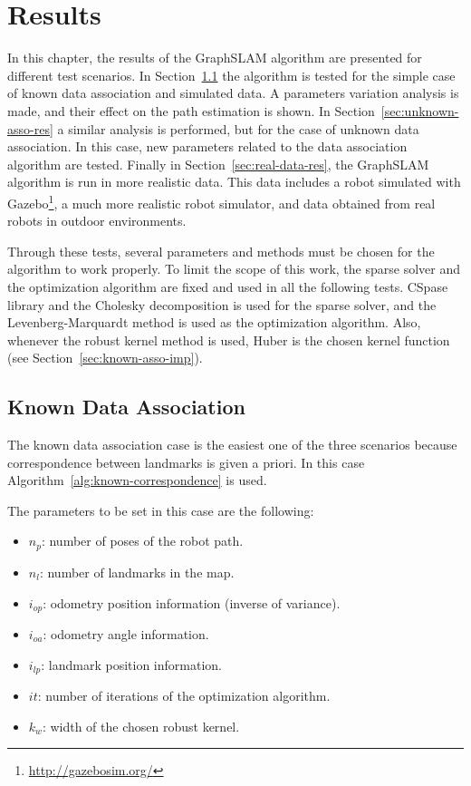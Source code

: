 \chapter{Results}
\label{chap:results}

In this chapter, the results of the GraphSLAM algorithm are presented for different test scenarios. In Section~\ref{sec:known-asso-res} the algorithm is tested for the simple case of known data association and simulated data. A parameters variation analysis is made, and their effect on the path estimation is shown. In Section~\ref{sec:unknown-asso-res} a similar analysis is performed, but for the case of unknown data association. In this case, new parameters related to the data association algorithm are tested. Finally in Section~\ref{sec:real-data-res}, the GraphSLAM algorithm is run in more realistic data. This data includes a robot simulated with Gazebo\footnote{\url{http://gazebosim.org/}}, a much more realistic robot simulator, and data obtained from real robots in outdoor environments. 

Through these tests, several parameters and methods must be chosen for the algorithm to work properly. To limit the scope of this work, the sparse solver and the optimization algorithm are fixed and used in all the following tests. CSpase library and the Cholesky decomposition is used for the sparse solver, and the Levenberg-Marquardt method is used as the optimization algorithm. Also, whenever the robust kernel method is used, Huber is the chosen kernel function (see Section~\ref{sec:known-asso-imp}). 

\section{Known Data Association}
\label{sec:known-asso-res}

The known data association case is the easiest one of the three scenarios because correspondence between landmarks is given a priori. In this case Algorithm~\ref{alg:known-correspondence} is used. 

The parameters to be set in this case are the following:

\begin{itemize}
    \item $n_p$: number of poses of the robot path.
    \item $n_l$: number of landmarks in the map.
    \item $i_{op}$: odometry position information (inverse of variance).
    \item $i_{oa}$: odometry angle information.
    \item $i_{lp}$: landmark position information.
    \item $it$: number of iterations of the optimization algorithm.
    \item $k_w$: width of the chosen robust kernel.
\end{itemize}

